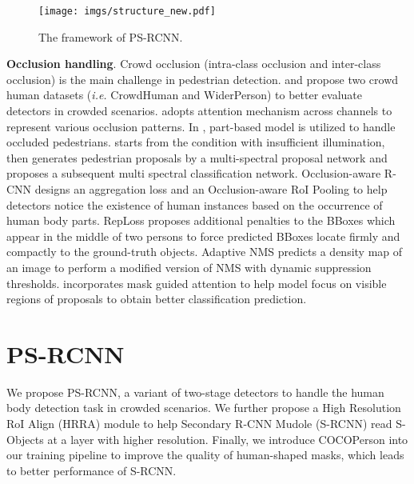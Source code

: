\documentclass{article}
\begin{document}
\begin{figure*}[!t]
\begin{center}
\texttt{[image: imgs/structure\_new.pdf]}
\end{center}
 \vspace{-0.3cm}
   \caption{The framework of PS-RCNN. }
   \label{fstructure}
\vspace{-0.5cm}
\end{figure*}

\noindent \textbf{Occlusion handling}. Crowd occlusion (intra-class occlusion and inter-class occlusion) is the main challenge in pedestrian detection. 
\cite{CrowdHuman} and \cite{Zhang2019WiderPerson} propose two crowd human datasets (\emph{i.e.} CrowdHuman and WiderPerson) to better evaluate detectors in crowded scenarios. \cite{8578829} adopts attention mechanism across channels to represent various occlusion patterns. In \cite{6248062,8237639}, part-based model is utilized to handle occluded pedestrians. \cite{li2018multispectral} starts from the condition with insufficient illumination, then generates pedestrian proposals by a multi-spectral proposal network and proposes a subsequent multi spectral classification network. Occlusion-aware R-CNN\cite{Zhang2018Occlusion} designs an aggregation loss and an Occlusion-aware RoI Pooling to help detectors notice the existence of human instances based on the occurrence of human body parts. RepLoss \cite{Repulsionloss} proposes additional penalties to the BBoxes which appear in the middle of two persons to force predicted BBoxes locate firmly and compactly to the ground-truth objects. Adaptive NMS \cite{Liu2019Adaptive} predicts a density map of an image to perform a modified version of NMS with dynamic suppression thresholds. \cite{pang2019maskguided} incorporates mask guided attention to help model focus on visible regions of proposals to obtain better classification prediction. 















\section{PS-RCNN}
\vspace{-0.2cm}

We propose PS-RCNN, a variant of two-stage detectors to handle the human body detection task in crowded scenarios. We further propose a High Resolution RoI Align (HRRA) module to help Secondary R-CNN Mudole (S-RCNN) read S-Objects at a layer with higher resolution. Finally, we introduce COCOPerson into our training pipeline to improve the quality of human-shaped masks, which leads to better performance of S-RCNN.
\end{document}
